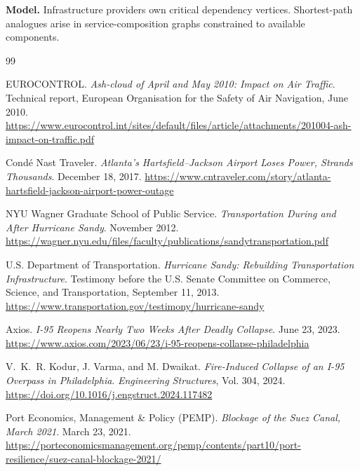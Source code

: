 \documentclass[11pt]{article}
\begin{document}
\textbf{Model.} Infrastructure providers own critical dependency vertices. Shortest-path analogues arise in service-composition graphs constrained to available components.

\begin{thebibliography}{99}

    EUROCONTROL.
    \newblock \emph{Ash-cloud of April and May 2010: Impact on Air Traffic}.
    \newblock Technical report, European Organisation for the Safety of Air Navigation, June 2010.
    \newblock \url{https://www.eurocontrol.int/sites/default/files/article/attachments/201004-ash-impact-on-traffic.pdf}
    
    Cond\'e Nast Traveler.
    \newblock \emph{Atlanta's Hartsfield--Jackson Airport Loses Power, Strands Thousands}.
    \newblock December 18, 2017.
    \newblock \url{https://www.cntraveler.com/story/atlanta-hartsfield-jackson-airport-power-outage}
    
    NYU Wagner Graduate School of Public Service.
    \newblock \emph{Transportation During and After Hurricane Sandy}.
    \newblock November 2012.
    \newblock \url{https://wagner.nyu.edu/files/faculty/publications/sandytransportation.pdf}
    
    U.S. Department of Transportation.
    \newblock \emph{Hurricane Sandy: Rebuilding Transportation Infrastructure}.
    \newblock Testimony before the U.S. Senate Committee on Commerce, Science, and Transportation, September 11, 2013.
    \newblock \url{https://www.transportation.gov/testimony/hurricane-sandy}
    
    Axios.
    \newblock \emph{I-95 Reopens Nearly Two Weeks After Deadly Collapse}.
    \newblock June 23, 2023.
    \newblock \url{https://www.axios.com/2023/06/23/i-95-reopens-collapse-philadelphia}
    
    V.~K.~R. Kodur, J. Varma, and M. Dwaikat.
    \newblock \emph{Fire-Induced Collapse of an I-95 Overpass in Philadelphia}.
    \newblock \emph{Engineering Structures}, Vol. 304, 2024.
    \newblock \url{https://doi.org/10.1016/j.engstruct.2024.117482}
    
    Port Economics, Management \& Policy (PEMP).
    \newblock \emph{Blockage of the Suez Canal, March 2021}.
    \newblock March 23, 2021.
    \newblock \url{https://porteconomicsmanagement.org/pemp/contents/part10/port-resilience/suez-canal-blockage-2021/}
    

\end{thebibliography}
\end{document}
